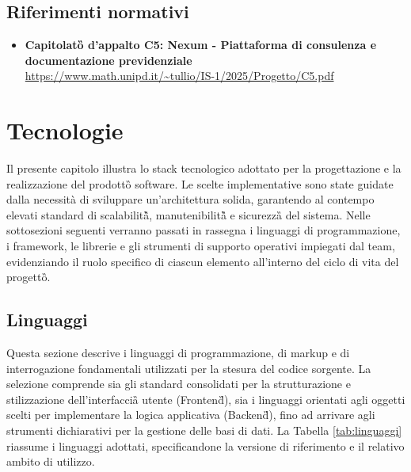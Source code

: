 \documentclass[a4paper,11pt]{article}
\begin{document}
\subsection{Riferimenti normativi}
\begin{itemize}
\item \textbf{Capitolato\G{}
 d'appalto C5: Nexum - Piattaforma di consulenza e documentazione previdenziale}\\
\url{https://www.math.unipd.it/~tullio/IS-1/2025/Progetto/C5.pdf}
\end{itemize}

\section{Tecnologie}
Il presente capitolo illustra lo stack tecnologico adottato per la progettazione e la realizzazione del prodotto\G{} software. Le scelte implementative sono state guidate dalla necessità di sviluppare un'architettura solida, garantendo al contempo elevati standard di scalabilità\G{}, manutenibilità\G{} e sicurezza\G{} del sistema. Nelle sottosezioni seguenti verranno passati in rassegna i linguaggi di programmazione, i framework, le librerie e gli strumenti di supporto operativi impiegati dal team, evidenziando il ruolo specifico di ciascun elemento all'interno del ciclo di vita del progetto\G{}.

\subsection{Linguaggi}
Questa sezione descrive i linguaggi di programmazione, di markup e di interrogazione fondamentali utilizzati per la stesura del codice sorgente. La selezione comprende sia gli standard consolidati per la strutturazione e stilizzazione dell'interfaccia\G{} utente (Frontend\G{}), sia i linguaggi orientati agli oggetti scelti per implementare la logica applicativa (Backend\G{}), fino ad arrivare agli strumenti dichiarativi per la gestione delle basi di dati. La Tabella \ref{tab:linguaggi} riassume i linguaggi adottati, specificandone la versione di riferimento e il relativo ambito di utilizzo.
\end{document}

